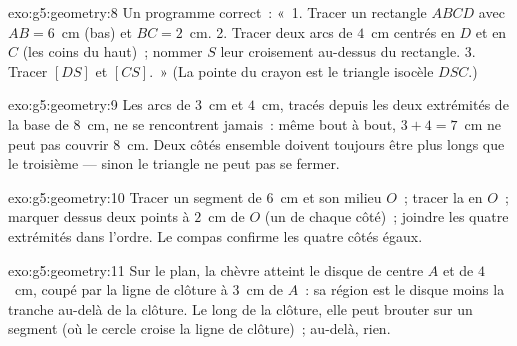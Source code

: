 \begin{solution}{exo:g5:geometry:8}
Un programme correct~: «~1. Tracer un rectangle $ABCD$ avec
$AB = 6$~cm (bas) et $BC = 2$~cm. 2. Tracer deux arcs de 
$4$~cm centrés en $D$ et en $C$ (les coins du haut)~; nommer $S$
leur croisement au-dessus du rectangle. 3. Tracer $[DS]$ et
$[CS]$.~» (La pointe du crayon est le triangle isocèle $DSC$.)
\end{solution}

\begin{solution}{exo:g5:geometry:9}
Les arcs de  $3$~cm et $4$~cm, tracés depuis les deux
extrémités de la base de $8$~cm, ne se rencontrent jamais~: même
bout à bout, $3 + 4 = 7$~cm ne peut pas couvrir $8$~cm. Deux côtés
ensemble doivent toujours être plus longs que le troisième ---
sinon le triangle ne peut pas se fermer.
\end{solution}

\begin{solution}{exo:g5:geometry:10}
Tracer un segment de $6$~cm et son milieu $O$~; tracer la
 en $O$~; marquer dessus deux points à $2$~cm de $O$
(un de chaque côté)~; joindre les quatre extrémités dans l'ordre. Le
compas confirme les quatre côtés égaux.
\end{solution}

\begin{solution}{exo:g5:geometry:11}
Sur le plan, la chèvre atteint le disque de centre $A$ et de 
$4$~cm, coupé par la ligne de clôture à $3$~cm de $A$~: sa région
est le disque moins la tranche au-delà de la clôture. Le long de la
clôture, elle peut brouter sur un segment (où le cercle croise la
ligne de clôture)~; au-delà, rien.
\end{solution}

